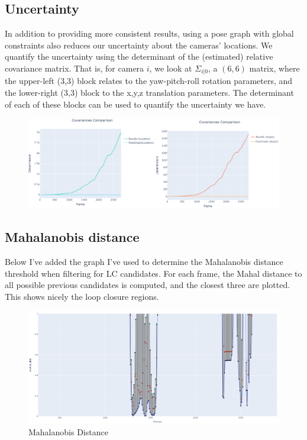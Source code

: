 \documentclass[12pt]{article}
\begin{document}
\newpage
\subsection{Uncertainty}
In addition to providing more consistent results, using a pose graph with global constraints also reduces our uncertainty about the cameras' locations. We quantify the uncertainty using the determinant of the (estimated) relative covariance matrix. That is, for camera $i$, we look at $\Sigma_{i|0}$, a $(6,6)$ matrix, where the upper-left (3,3) block relates to the yaw-pitch-roll rotation parameters, and the lower-right (3,3) block to the x,y,z translation parameters. The determinant of each of these blocks can be used to quantify the uncertainty we have.
\begin{figure}[H]
\includegraphics[width=\textwidth]{determinant angle location}
\end{figure}
\subsection*{Mahalanobis distance}
Below I've added the graph I've used to determine the Mahalanobis distance threshold when filtering for LC candidates. For each frame, the Mahal distance to all possible previous candidates is computed, and the closest three are plotted. This shows nicely the loop closure regions. 
\begin{figure}[H]
\caption*{Mahalanobis Distance}
\includegraphics[width=\textwidth]{mahal dist}
\end{figure}
\newpage
\end{document}
